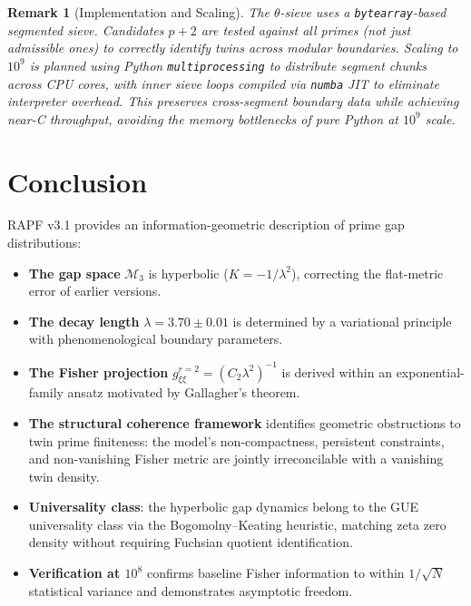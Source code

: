 \documentclass[12pt]{article}
\newtheorem{remark}[theorem]{Remark}
\begin{document}
\begin{remark}[Implementation and Scaling]
The $\theta$-sieve uses a \texttt{bytearray}-based segmented sieve. Candidates
$p+2$ are tested against \textit{all} primes (not just admissible ones) to
correctly identify twins across modular boundaries.
Scaling to $10^9$ is planned using Python \texttt{multiprocessing} to distribute
segment chunks across CPU cores, with inner sieve loops compiled via \texttt{numba}
JIT to eliminate interpreter overhead. This preserves cross-segment boundary data
while achieving near-C throughput, avoiding the memory bottlenecks of pure Python
at $10^9$ scale.
\end{remark}

\section{Conclusion}

RAPF v3.1 provides an information-geometric description of prime gap distributions:

\begin{itemize}
  \item \textbf{The gap space} $\mathcal{M}_3$ is hyperbolic ($K = -1/\lambda^2$),
    correcting the flat-metric error of earlier versions.
  \item \textbf{The decay length} $\lambda = 3.70 \pm 0.01$ is determined by a
    variational principle with phenomenological boundary parameters.
  \item \textbf{The Fisher projection} $g_{\xi\xi}^{r=2} = (C_2\lambda^2)^{-1}$
    is derived within an exponential-family ansatz motivated by Gallagher's theorem.
  \item \textbf{The structural coherence framework} identifies geometric obstructions
    to twin prime finiteness: the model's non-compactness, persistent constraints,
    and non-vanishing Fisher metric are jointly irreconcilable with a vanishing
    twin density.
  \item \textbf{Universality class}: the hyperbolic gap dynamics belong to the GUE
    universality class via the Bogomolny--Keating heuristic, matching zeta zero
    density without requiring Fuchsian quotient identification.
  \item \textbf{Verification at $10^8$} confirms baseline Fisher information to
    within $1/\sqrt{N}$ statistical variance and demonstrates asymptotic freedom.
\end{itemize}
\end{document}
